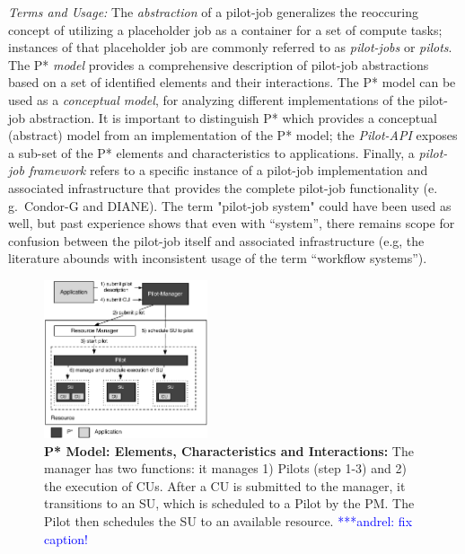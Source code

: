 \documentclass[conference,final]{IEEEtran}
\newcommand{\jhanote}[1]{ {\textcolor{red} { ***shantenu: #1 }}}
\newcommand{\alnote}[1]{ {\textcolor{blue} { ***andrel: #1 }}}
\newcommand{\alnote}[1]{}
\newcommand{\jhanote}[1]{}
\newcommand{\pilot}{Pilot\xspace}
\newcommand{\cu}{CU\xspace}
\newcommand{\cus}{CUs\xspace}
\newcommand{\su}{SU\xspace}
\newcommand{\up}{\vspace*{-1em}}
\newcommand{\upp}{\vspace*{-0.5em}}
\begin{document}
\emph{Terms and Usage:} The \emph{ abstraction} of a pilot-job
generalizes the reoccuring concept of utilizing a placeholder job as a
container for a set of compute tasks; instances of that placeholder
job are commonly referred to as \emph{pilot-jobs} or
\emph{pilots}. The P* \emph{model} provides a %
comprehensive description of pilot-job abstractions based on a set of
identified elements and their interactions. The P* model can be used
as a {\it conceptual model}, for analyzing different implementations
of the pilot-job abstraction. It is important to distinguish P* which
provides a conceptual (abstract) model from an implementation of the
P* model; the \emph{Pilot-API} exposes a sub-set of the P* elements
and characteristics to applications. Finally, a \emph{pilot-job
  framework} refers to a specific instance of a pilot-job
implementation and associated infrastructure that provides the
complete pilot-job functionality (e.\,g.\ Condor-G and DIANE).  The
term "pilot-job system" could have been used as well, but past
experience shows that even with ``system'', there remains scope for
confusion between the pilot-job itself and associated infrastructure
(e.g, the literature abounds with inconsistent usage of the term
``workflow systems'').





\begin{figure}[t]
    \centering\up
    \includegraphics[width=0.43\textwidth]{figures/pstar_model_single.pdf}
    \caption{ \textbf{P* Model: Elements, Characteristics and Interactions:} The 	 	
  	  manager has two functions: it manages 1) Pilots (step 1-3) and 2) the 
      execution of \cus. After a \cu is submitted to the manager, it
      transitions to an \su, which is scheduled to a \pilot by the
      PM. The \pilot then schedules the \su to an available
      resource. \alnote{fix caption!}
      \upp\upp}
    \label{fig:figures_pstar}
\end{figure}
\end{document}
